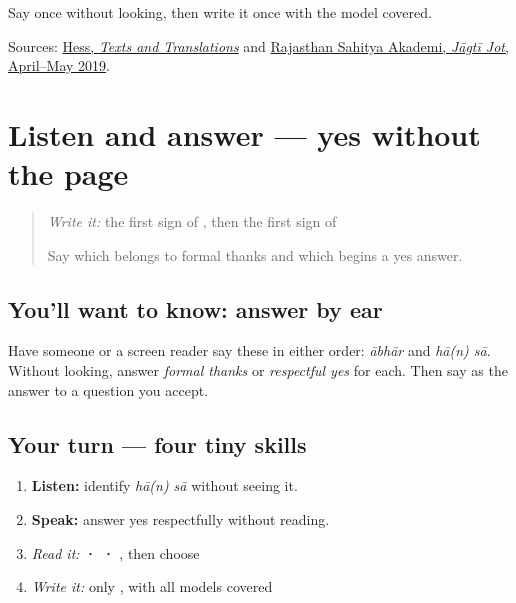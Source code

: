 \begin{tcolorbox}[breakable,colback=teal!4,colframe=teal!35!black,title={Before you move on}]
Say \textbf{ } once without looking, then write it once with the model covered.

Sources: \href{https://hasp.ub.uni-heidelberg.de/catalog/view/1151/2059/103085}{Hess, \emph{Texts and Translations}} and \href{https://rbssa.artandculture.rajasthan.gov.in/content/dam/doitassets/art-and-culture/Rajasthani-Bhasha-Sahitya-Avm-Sanskriti-Academy-Bikaner/pdf/JJ\_All\_Pdf/JJ\_47\_01\_02\_April\_to\_May\_2019.pdf}{Rajasthan Sahitya Akademi, \emph{Jāgtī Jot}, April–May 2019}.
\end{tcolorbox}
\section[hā(n) sā]{Listen and answer — yes without the page}

\label{lesson:MW-C03-listen-say}



\begin{quote}
\emph{Write it:} the first sign of \textbf{}, then the first sign of \textbf{ }

Say which belongs to formal thanks and which begins a yes answer.
\end{quote}

\subsection*{You'll want to know: answer by ear}
Have someone or a screen reader say these in either order: \emph{ābhār} and \emph{hā(n) sā}. Without looking, answer \emph{formal thanks} or \emph{respectful yes} for each. Then say \textbf{ } as the answer to a question you accept.

\subsection*{Your turn — four tiny skills}
\begin{enumerate}
\raggedright
  \item \textbf{Listen:} identify \emph{hā(n) sā} without seeing it.
  \item \textbf{Speak:} answer yes respectfully without reading.
  \item \emph{Read it:} \textbf{ ·   · }, then choose \textbf{ }
  \item \emph{Write it:} only \textbf{}, with all models covered
\end{enumerate}

